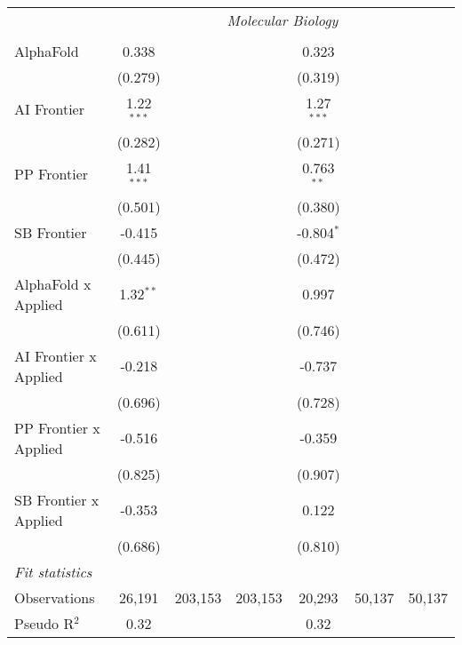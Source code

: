 \begin{tabular}{lcccccc}
 & \multicolumn{6}{c}{\textit{Molecular Biology}} \\ \\
   AlphaFold             & 0.338        &         &         & 0.323        &        &   \\   
                         & (0.279)      &         &         & (0.319)      &        &   \\   
   AI Frontier           & 1.22$^{***}$ &         &         & 1.27$^{***}$ &        &   \\   
                         & (0.282)      &         &         & (0.271)      &        &   \\   
   PP Frontier           & 1.41$^{***}$ &         &         & 0.763$^{**}$ &        &   \\   
                         & (0.501)      &         &         & (0.380)      &        &   \\   
   SB Frontier           & -0.415       &         &         & -0.804$^{*}$ &        &   \\   
                         & (0.445)      &         &         & (0.472)      &        &   \\   
   AlphaFold x Applied   & 1.32$^{**}$  &         &         & 0.997        &        &   \\   
                         & (0.611)      &         &         & (0.746)      &        &   \\   
   AI Frontier x Applied & -0.218       &         &         & -0.737       &        &   \\   
                         & (0.696)      &         &         & (0.728)      &        &   \\   
   PP Frontier x Applied & -0.516       &         &         & -0.359       &        &   \\   
                         & (0.825)      &         &         & (0.907)      &        &   \\   
   SB Frontier x Applied & -0.353       &         &         & 0.122        &        &   \\   
                         & (0.686)      &         &         & (0.810)      &        &   \\   
   \midrule
   \emph{Fit statistics}\\
   Observations          & 26,191       & 203,153 & 203,153 & 20,293       & 50,137 & 50,137\\  
   Pseudo R$^2$          & 0.32         &         &         & 0.32         &        & \\  
   

\end{tabular}
